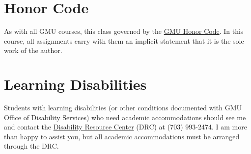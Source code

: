 \documentclass[11pt]{article}
\begin{document}
\section{Honor Code}
\label{sec:orgf24f4c5}

As with all GMU courses, this class governed by the \href{http://oai.gmu.edu/the-mason-honor-code/}{GMU Honor Code}. In this course, all assignments carry with them an implicit statement that it is the sole work of the author.

\section{Learning Disabilities}
\label{sec:org28deb33}

Students with learning disabilities (or other conditions documented with GMU Office of Disability Services) who need academic accommodations should see me and contact the \href{http://ods.gmu.edu/}{Disability Resource Center} (DRC) at (703) 993-2474. I am more than happy to assist you, but all academic accommodations must be arranged through the DRC.



\end{document}
